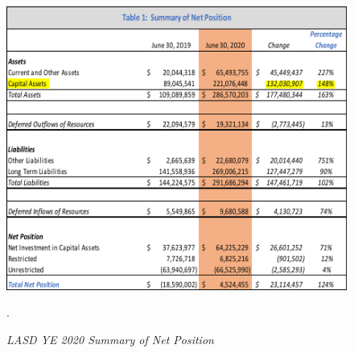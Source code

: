 \begin{figure}
  \centering
  \caption[LASD YE 2020 Summary of Net Position]{\textit{LASD YE 2020 Summary of Net Position}}%
  \label{fig:net-position}
  \includegraphics[width=\textwidth]{CAFR-YE2020_Summary_of_Net_Position}\\
  \footnotesize\raggedright\textcite[6]{Kenyon2021}.
\end{figure}

